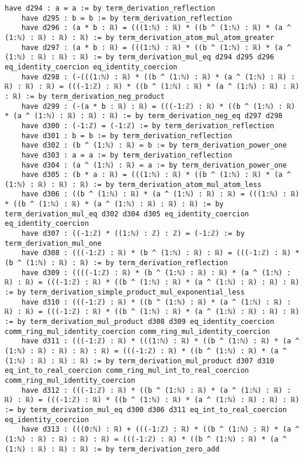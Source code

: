 \documentclass{article}
\begin{document}
\begin{tcolorbox}[colback=white!10, width=\linewidth]
\begin{lstlisting}[language=Lean4]
    have d294 : a = a := by term_derivation_reflection
    have d295 : b = b := by term_derivation_reflection
    have d296 : (a * b : ℝ) = (((1:ℕ) : ℝ) * ((b ^ (1:ℕ) : ℝ) * (a ^ (1:ℕ) : ℝ) : ℝ) : ℝ) := by term_derivation_atom_mul_atom_greater
    have d297 : (a * b : ℝ) = (((1:ℕ) : ℝ) * ((b ^ (1:ℕ) : ℝ) * (a ^ (1:ℕ) : ℝ) : ℝ) : ℝ) := by term_derivation_mul_eq d294 d295 d296 eq_identity_coercion eq_identity_coercion
    have d298 : (-(((1:ℕ) : ℝ) * ((b ^ (1:ℕ) : ℝ) * (a ^ (1:ℕ) : ℝ) : ℝ) : ℝ) : ℝ) = (((-1:ℤ) : ℝ) * ((b ^ (1:ℕ) : ℝ) * (a ^ (1:ℕ) : ℝ) : ℝ) : ℝ) := by term_derivation_neg_product
    have d299 : (-(a * b : ℝ) : ℝ) = (((-1:ℤ) : ℝ) * ((b ^ (1:ℕ) : ℝ) * (a ^ (1:ℕ) : ℝ) : ℝ) : ℝ) := by term_derivation_neg_eq d297 d298
    have d300 : (-1:ℤ) = (-1:ℤ) := by term_derivation_reflection
    have d301 : b = b := by term_derivation_reflection
    have d302 : (b ^ (1:ℕ) : ℝ) = b := by term_derivation_power_one
    have d303 : a = a := by term_derivation_reflection
    have d304 : (a ^ (1:ℕ) : ℝ) = a := by term_derivation_power_one
    have d305 : (b * a : ℝ) = (((1:ℕ) : ℝ) * ((b ^ (1:ℕ) : ℝ) * (a ^ (1:ℕ) : ℝ) : ℝ) : ℝ) := by term_derivation_atom_mul_atom_less
    have d306 : ((b ^ (1:ℕ) : ℝ) * (a ^ (1:ℕ) : ℝ) : ℝ) = (((1:ℕ) : ℝ) * ((b ^ (1:ℕ) : ℝ) * (a ^ (1:ℕ) : ℝ) : ℝ) : ℝ) := by term_derivation_mul_eq d302 d304 d305 eq_identity_coercion eq_identity_coercion
    have d307 : ((-1:ℤ) * ((1:ℕ) : ℤ) : ℤ) = (-1:ℤ) := by term_derivation_mul_one
    have d308 : (((-1:ℤ) : ℝ) * (b ^ (1:ℕ) : ℝ) : ℝ) = (((-1:ℤ) : ℝ) * (b ^ (1:ℕ) : ℝ) : ℝ) := by term_derivation_reflection
    have d309 : ((((-1:ℤ) : ℝ) * (b ^ (1:ℕ) : ℝ) : ℝ) * (a ^ (1:ℕ) : ℝ) : ℝ) = (((-1:ℤ) : ℝ) * ((b ^ (1:ℕ) : ℝ) * (a ^ (1:ℕ) : ℝ) : ℝ) : ℝ) := by term_derivation_simple_product_mul_exponential_less
    have d310 : (((-1:ℤ) : ℝ) * ((b ^ (1:ℕ) : ℝ) * (a ^ (1:ℕ) : ℝ) : ℝ) : ℝ) = (((-1:ℤ) : ℝ) * ((b ^ (1:ℕ) : ℝ) * (a ^ (1:ℕ) : ℝ) : ℝ) : ℝ) := by term_derivation_mul_product d308 d309 eq_identity_coercion comm_ring_mul_identity_coercion comm_ring_mul_identity_coercion
    have d311 : (((-1:ℤ) : ℝ) * (((1:ℕ) : ℝ) * ((b ^ (1:ℕ) : ℝ) * (a ^ (1:ℕ) : ℝ) : ℝ) : ℝ) : ℝ) = (((-1:ℤ) : ℝ) * ((b ^ (1:ℕ) : ℝ) * (a ^ (1:ℕ) : ℝ) : ℝ) : ℝ) := by term_derivation_mul_product d307 d310 eq_int_to_real_coercion comm_ring_mul_int_to_real_coercion comm_ring_mul_identity_coercion
    have d312 : (((-1:ℤ) : ℝ) * ((b ^ (1:ℕ) : ℝ) * (a ^ (1:ℕ) : ℝ) : ℝ) : ℝ) = (((-1:ℤ) : ℝ) * ((b ^ (1:ℕ) : ℝ) * (a ^ (1:ℕ) : ℝ) : ℝ) : ℝ) := by term_derivation_mul_eq d300 d306 d311 eq_int_to_real_coercion eq_identity_coercion
    have d313 : (((0:ℕ) : ℝ) + (((-1:ℤ) : ℝ) * ((b ^ (1:ℕ) : ℝ) * (a ^ (1:ℕ) : ℝ) : ℝ) : ℝ) : ℝ) = (((-1:ℤ) : ℝ) * ((b ^ (1:ℕ) : ℝ) * (a ^ (1:ℕ) : ℝ) : ℝ) : ℝ) := by term_derivation_zero_add

\end{lstlisting}
\end{tcolorbox}
\end{document}
